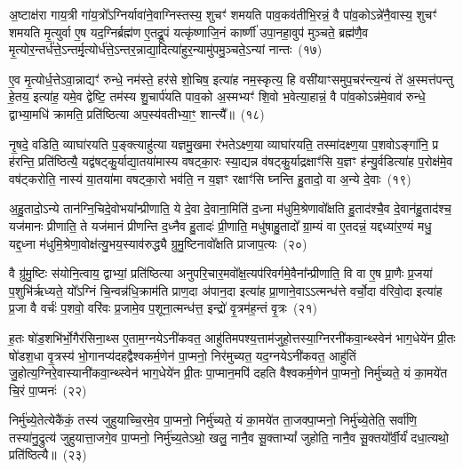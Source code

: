 अ॒ष्टाक्ष॑रा गाय॒त्री गा॑य॒त्रो᳚\-ऽग्निर्यावा॑ने॒वाग्निस्तस्य॒ शुचꣳ॑ शमयति पाव॒कव॑तीभि॒रन्नं॒ वै पा॑व॒को\-ऽन्ने॑नै॒वास्य॒ शुचꣳ॑ शमयति मृ॒त्युर्वा ए॒ष यद॒ग्निर्ब्रह्म॑ण ए॒तद्रू॒पं यत्कृ॑ष्णाजि॒नं कार्\mbox{}ष्णी॑ उपा॒नहा॒वुप॑ मुञ्चते॒ ब्रह्म॑णै॒व मृ॒त्योर॒न्तर्ध॑त्ते॒\-ऽन्तर्मृ॒त्योर्ध॑त्ते॒\-ऽन्तर॒न्नाद्या॒दित्या॑हुर॒न्यामु॑पमु॒ञ्चते॒\-ऽन्यां नान्तः~(१७)

ए॒व मृ॒त्योर्ध॒त्ते\-ऽवा॒न्नाद्यꣳ॑ रुन्धे॒ नम॑स्ते॒ हर॑से शो॒चिष॒ इत्या॑ह नम॒स्कृत्य॒ हि वसी॑याꣳसमुप॒चर॑न्त्य॒न्यं ते॑ अ॒स्मत्त॑पन्तु हे॒तय॒ इत्या॑ह॒ यमे॒व द्वेष्टि॒ तम॑स्य शु॒चार्प॑यति पाव॒को अ॒स्मभ्यꣳ॑ शि॒वो भ॒वेत्या॒हान्नं॒ वै पा॑व॒को\-ऽन्न॑मे॒वाव॑ रुन्धे॒ द्वाभ्या॒मधि॑ क्रामति॒ प्रति॑ष्ठित्या अप॒स्य॑वतीभ्या॒ꣳ॒ शान्त्यै᳚॥~(१८)

{\anuvakamend[{शुग्वे॑त॒सो॑\-ऽपाम॑ष्टा॒भिर्विक॑र्\mbox{}षति॒ नान्तरेका॒न्नप॑ञ्चा॒शच्च॑}]}%

नृ॒षदे॒ वडिति॒ व्याघा॑रयति प॒ङ्क्त्याहु॑त्या यज्ञमु॒खमा र॑भते\-ऽक्ष्ण॒या व्याघा॑रयति॒ तस्मा॑दक्ष्ण॒या प॒शवो\-ऽङ्गा॑नि॒ प्र ह॑रन्ति॒ प्रति॑ष्ठित्यै॒ यद्व॑षट्कु॒र्याद्या॒तया॑मास्य वषट्का॒रः स्या॒द्यन्न व॑षट्कु॒र्याद्रक्षाꣳ॑सि य॒ज्ञꣳ ह॑न्यु॒र्वडित्या॑ह प॒रोक्ष॑मे॒व वष॑ट्करोति॒ नास्य॑ या॒तया॑मा वषट्का॒रो भव॑ति॒ न य॒ज्ञꣳ रक्षाꣳ॑सि घ्नन्ति हु॒तादो॒ वा अ॒न्ये दे॒वाः~(१९)

अ॒हु॒तादो॒\-ऽन्ये तान॑ग्नि॒चिदे॒वोभया᳚न्प्रीणाति॒ ये दे॒वा दे॒वाना॒मिति॑ द॒ध्ना म॑धुमि॒श्रेणावो᳚क्षति हु॒ताद॑श्चै॒व दे॒वान॑हु॒ताद॑श्च॒ यज॑मानः प्रीणाति॒ ते यज॑मानं प्रीणन्ति द॒ध्नैव हु॒तादः॑ प्री॒णाति॒ मधु॑षाहु॒तादो᳚ ग्रा॒म्यं वा ए॒तदन्नं॒ यद्दध्या॑र॒ण्यं मधु॒ यद्द॒ध्ना म॑धुमि॒श्रेणा॒वोक्ष॑त्यु॒भय॒स्याव॑रुद्ध्यै ग्रुमु॒ष्टिनावो᳚क्षति प्राजाप॒त्यः~(२०)

वै ग्रु॑मु॒ष्टिः स॑योनि॒त्वाय॒ द्वाभ्यां॒ प्रति॑ष्ठित्या अनुपरि॒चार॒मवो᳚क्ष॒त्यप॑रिवर्गमे॒वैना᳚न्प्रीणाति॒ वि वा ए॒ष प्रा॒णैः प्र॒जया॑ प॒शुभि॑र्\mbox{}ऋध्यते॒ यो᳚\-ऽग्निं चि॒न्वन्न॑धि॒क्राम॑ति प्राण॒दा अ॑पान॒दा इत्या॑ह प्रा॒णाने॒वा\-ऽऽ\-त्मन्ध॑त्ते वर्चो॒दा व॑रिवो॒दा इत्या॑ह प्र॒जा वै वर्चः॑ प॒शवो॒ वरि॑वः प्र॒जामे॒व प॒शूना॒त्मन्ध॑त्त॒ इन्द्रो॑ वृ॒त्रम॑ह॒न्तं वृ॒त्रः~(२१)

ह॒तः षो॑ड॒शभि॑र्भो॒गैर॑सिना॒थ्स ए॒ताम॒ग्नये\-ऽनी॑कवत॒ आहु॑तिमपश्य॒त्ताम॑जुहो॒त्तस्या॒ग्निरनी॑कवा॒न्थ्स्वेन॑ भाग॒धेये॑न प्री॒तः षो॑डश॒धा वृ॒त्रस्य॑ भो॒गानप्य॑दहद्वैश्वकर्म॒णेन॑ पा॒प्मनो॒ निर॑मुच्यत॒ यद॒ग्नये\-ऽनी॑कवत॒ आहु॑तिं जु॒होत्य॒ग्निरे॒वास्यानी॑कवा॒न्थ्स्वेन॑ भाग॒धेये॑न प्री॒तः पा॒प्मान॒मपि॑ दहति वैश्वकर्म॒णेन॑ पा॒प्मनो॒ निर्मु॑च्यते॒ यं का॒मये॑त चि॒रं पा॒प्मनः॑~(२२)

निर्मु॑च्ये॒तेत्येकै॑कं॒ तस्य॑ जुहुयाच्चि॒रमे॒व पा॒प्मनो॒ निर्मु॑च्यते॒ यं का॒मये॑त ता॒जक्पा॒प्मनो॒ निर्मु॑च्ये॒तेति॒ सर्वा॑णि॒ तस्या॑नु॒द्रुत्य॑ जुहुयात्ता॒जगे॒व पा॒प्मनो॒ निर्मु॑च्य॒ते\-ऽथो॒ खलु॒ नानै॒व सू॒क्ता\-भ्यां᳚ जुहोति॒ नानै॒व सू॒क्तयो᳚र्वी॒र्यं॑ दधा॒त्यथो॒ प्रति॑ष्ठित्यै॥~(२३)

